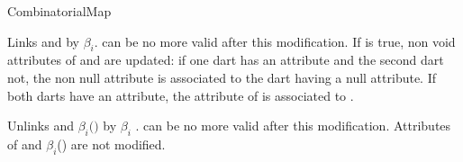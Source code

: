 \begin{ccRefConcept}{CombinatorialMap}
\begin{ccAdvanced}

{Links  and   by $\beta_i$. 
   can be no more valid after this modification.  If
   is true, non void attributes of  and
   are updated: if one dart has an attribute and the second
  dart not, the non null attribute is associated to the dart having a null attribute. 
  If both darts have an attribute, 
  the attribute of  is associated to .
  }




  {Unlinks  and $\beta_i($$)$ by $\beta_i$ .
     can be no more valid after this modification. 
    Attributes of  and $\beta_i$()
    are not modified.
    }


\end{ccAdvanced}


\end{ccRefConcept}
